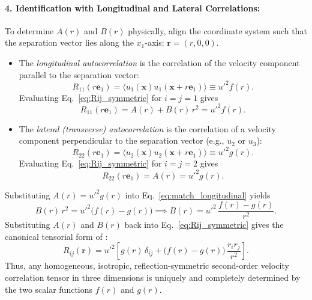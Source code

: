 \documentclass[lineno]{jfm}
\begin{document}
\paragraph{4. Identification with Longitudinal and Lateral Correlations:}
To determine $A(r)$ and $B(r)$ physically, align the coordinate system such that the separation vector lies along the $x_1$-axis: $\mathbf{r} = (r, 0, 0)$.
\begin{itemize}
\item The \emph{longitudinal autocorrelation} is the correlation of the velocity component parallel to the separation vector:
\begin{equation}
R_{11}(r \mathbf{e}_1) = \langle u_1(\mathbf{x}) u_1(\mathbf{x} + r\mathbf{e}_1) \rangle \equiv u'^2 f(r).
\label{eq:f_def_parallel}
\end{equation}
Evaluating Eq.~\eqref{eq:Rij_symmetric} for $i=j=1$ gives
\begin{equation}
R_{11}(r \mathbf{e}_1) = A(r) + B(r)\,r^2 = u'^2 f(r).
\label{eq:match_longitudinal}
\end{equation}
\item The \emph{lateral (transverse) autocorrelation} is the correlation of a velocity component perpendicular to the separation vector (e.g., $u_2$ or $u_3$):
\begin{equation}
R_{22}(r \mathbf{e}_1) = \langle u_2(\mathbf{x}) u_2(\mathbf{x} + r\mathbf{e}_1) \rangle \equiv u'^2 g(r).
\label{eq:g_def_transverse}
\end{equation}
Evaluating Eq.~\eqref{eq:Rij_symmetric} for $i=j=2$ gives
\begin{equation}
R_{22}(r \mathbf{e}_1) = A(r) = u'^2 g(r).
\label{eq:match_lateral}
\end{equation}
\end{itemize}
Substituting $A(r) = u'^2 g(r)$ into Eq.~\eqref{eq:match_longitudinal} yields
\begin{equation}
B(r)\,r^2 = u'^2 \big(f(r) - g(r)\big) \implies B(r) = u'^2\,\frac{f(r) - g(r)}{r^2}.
\label{eq:solve_B}
\end{equation}
Substituting $A(r)$ and $B(r)$ back into Eq.~\eqref{eq:Rij_symmetric} gives the canonical tensorial form of \citet{vonKarmanHowarth1938}:
\begin{equation}
R_{ij}(\mathbf{r}) = u'^2 \left[ g(r)\,\delta_{ij} + \big(f(r) - g(r)\big)\,\frac{r_i r_j}{r^2} \right].
\label{eq:Rij_canonical_proven}
\end{equation}
Thus, any homogeneous, isotropic, reflection-symmetric second-order velocity correlation tensor in three dimensions is uniquely and completely determined by the two scalar functions $f(r)$ and $g(r)$.
\end{document}
